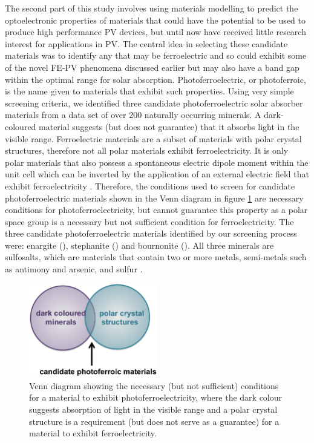 The second part of this study involves using materials modelling to predict the optoelectronic properties of materials that could have the potential to be used to produce high performance PV devices, but until now have received little research interest for applications in PV.  The central idea in selecting these candidate materials was to identify any that may be ferroelectric and so could exhibit some of the novel FE-PV phenomena discussed earlier but may also have a band gap within the optimal range for solar absorption. Photoferroelectric, or photoferroic, is the name given to materials that exhibit such properties. 
Using very simple screening criteria, we identified three candidate photoferroelectric solar absorber materials from a data set of over 200 naturally occurring minerals. 
A dark-coloured material suggests (but does not guarantee) that it absorbs light in the visible range. Ferroelectric materials are a subset of materials with polar crystal structures, therefore not all polar materials exhibit ferroelectricity. It is only polar materials that also possess a spontaneous electric dipole moment within the unit cell which can be inverted by the application of an external electric field that exhibit ferroelectricity \cite{FE_subset}. 
Therefore, the conditions used to screen for candidate photoferroelectric materials shown in the Venn diagram in figure \ref{vd} are necessary conditions for photoferroelectricity, but cannot guarantee this property as a polar space group is a necessary but not sufficient condition for ferroelectricity.
The three candidate photoferroelectric materials identified by our screening process were: enargite (\enargite), stephanite (\stephanite) and bournonite (\bournonite). All three minerals are sulfosalts, which are materials that contain two or more metals, semi-metals such as antimony and arsenic, and sulfur \cite{DK}. \\

\begin{figure}[h!]
  \centering
    \includegraphics[width=0.5\textwidth]{figures/venn_diagram.png}
    \caption{Venn diagram showing the necessary (but not sufficient) conditions for a material to exhibit photoferroelectricity, where the dark colour suggests absorption of light in the visible range and a polar crystal structure is a requirement (but does not serve as a guarantee) for a material to exhibit ferroelectricity.}
  \label{vd}
\end{figure}

